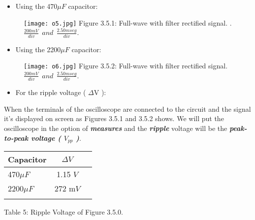 \begin{multicols}{2}
\begin{itemize}
\item Using the 470$\mu F$ capacitor:
\end{itemize}

\begin{figure}[H]
\texttt{[image: o5.jpg]}
\centering \linebreak \linebreak Figure 3.5.1: Full-wave with filter rectified signal.
\linebreak .\linebreak $\frac{200 mV}{div}\ \ and\ \ \frac{2.50 mseg}{div}$.
\end{figure}

\begin{itemize}
\item Using the 2200$\mu F$ capacitor:
\end{itemize}

\begin{figure}[H]
\texttt{[image: o6.jpg]}
\centering \linebreak \linebreak Figure 3.5.2: Full-wave with filter rectified signal.
\linebreak \linebreak $\frac{200 mV}{div}\ \ and\ \ \frac{2.50 mseg}{div}$.
\end{figure}
\end{multicols}

{\bfseries\itshape
\begin{itemize}
\item For the ripple voltage ( $\Delta$V ):
\end{itemize}}

When the terminals of the oscilloscope are connected to the circuit and the signal it's displayed on screen as Figures 3.5.1 and 3.5.2 shows. We will put the oscilloscope in the option of {\bfseries\itshape measures} and the {\bfseries\itshape ripple} voltage will be the {\bfseries\itshape peak-to-peak voltage ( $V_{pp}$ )}. \hfill \break

\begin{center}
\begin{tabular}[.5cm]{l c c }
\toprule
Capacitor & $\Delta V$  \\
\midrule
470$\mu F$ & 1.15 $V$ \\
\cmidrule{1-2}
2200$\mu F$ & 272 m$V$ \\
\bottomrule
\linebreak
\end{tabular}
\centering \linebreak Table 5: Ripple Voltage of Figure 3.5.0.
\end{center} 

\pagebreak